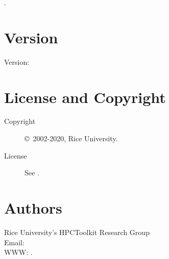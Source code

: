 \documentclass[english]{article}
\begin{document}
.

\section{Version}

Version: \Version

\section{License and Copyright}

\begin{description}
\item[Copyright] \copyright\ 2002-2020, Rice University.
\item[License] See .
\end{description}

\section{Authors}

\noindent
Rice University's HPCToolkit Research Group \\
Email:  \\
WWW: .

\LatexManEnd
\end{document}
